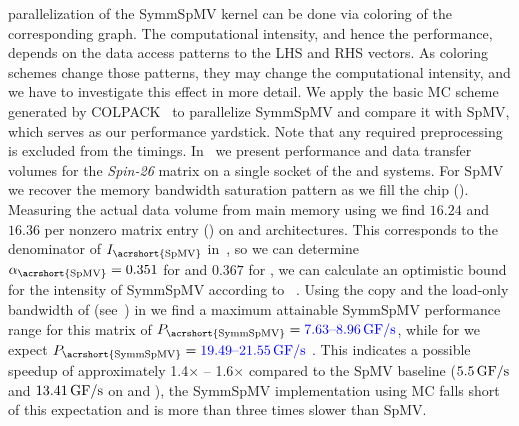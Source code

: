 
  parallelization of
the \acrshort{SymmSpMV} kernel can be done
via \DTWO coloring of the corresponding graph. The computational
intensity, and hence the performance, depends on the data access
patterns to the LHS and RHS vectors. As coloring schemes change those
patterns, they may change the computational intensity, and we have to
investigate this effect in more detail. We apply the basic
\acrshort{MC} scheme generated by COLPACK~\cite{COLPACK} to
parallelize \acrshort{SymmSpMV} and compare it with \acrshort{SpMV},
which serves as our performance yardstick. Note that any required
preprocessing is excluded from the timings. In~
we present performance and data transfer volumes for
the \emph{Spin-26} matrix on a single socket of the \IVB
and \SKX systems. 
For \acrshort{SpMV} we recover the  memory bandwidth
saturation pattern as we fill the chip ().
 Measuring the actual data volume from main memory using \LIKWID
we find $16.24$ and $16.36$ \BYTE per nonzero matrix entry ()
on \IVB and \SKX architectures.
 This corresponds to the denominator of
$I_\mathrm{\acrshort{SpMV}}$ in~, so we can
determine $\alpha_\mathrm{\acrshort{SpMV}}=0.351$ for \IVB and $0.367$ for \SKX,   we can calculate an 
optimistic bound for the intensity of \acrshort{SymmSpMV} according to ~.
 Using the copy and the load-only bandwidth of \IVB (see~) 
 in  we find a maximum
attainable {\acrshort{SymmSpMV}} performance range for this matrix of
$P_\mathrm{\acrshort{SymmSpMV}}= \rAdd{7.63 \text{--} 8.96\,\GF}$, 
while for \SKX we expect  
$P_\mathrm{\acrshort{SymmSpMV}}=\rAdd{19.49 \text{--} 21.55\,\GF}$ . 
This indicates a possible
speedup of approximately 1.4$\times$ -- 1.6$\times$ compared to the \acrshort{SpMV}
baseline ($5.5\,\mbox{GF/s}$ and $13.41\,\mbox{GF/s}$ on \IVB and \SKX), the \acrshort{SymmSpMV} implementation
using \acrshort{MC} falls short of this expectation and is more than
three times slower than \acrshort{SpMV}.
